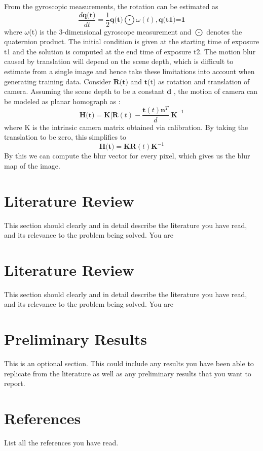 \documentclass[10pt,twocolumn,letterpaper]{article}
\begin{document}
From the gyroscopic measurements, the rotation can be estimated as
\begin{equation}
    \frac{d \textbf{q(t)}}{dt} = \frac{1}{2}\textbf{q(t)} \bigodot \omega(t), \textbf{q(t1)=1}
\end{equation}
where $\omega$(t) is the 3-dimensional gyroscope measurement and $\bigodot$ denotes the quaternion product. The initial condition is given at the starting time of exposure t1 and the solution is computed at the end time of exposure t2.
The motion blur caused by translation will depend on the scene depth, which is difficult to estimate from a single image and hence take these limitations into account when generating training data. Consider $\textbf{R(t)}$ and $\textbf{t}$(t) as rotation and translation of camera. Assuming the scene depth to be a constant $\textbf{d}$ , the motion of camera can be modeled as planar homograph as :
\begin{equation}
    \textbf{H(t)} = \textbf{K[R}(t) - \frac{\textbf{t}(t)\textbf{n}^{T}}{d}\textbf{]K}^{-1}
\end{equation}
where K is the intrinsic camera matrix obtained via calibration. By taking the translation to be zero, this simplifies to 
\begin{equation}
    \textbf{H(t)} = \textbf{KR}(t)\textbf{K}^{-1}
\end{equation}
By this we can compute the blur vector for every pixel, which gives us the blur map of the image.
\section{Literature Review}
\label{sec:literature}
This section should clearly and in detail describe the literature you have read, and its relevance to the problem being solved. You are 


\section{Literature Review}
\label{sec:literature}
This section should clearly and in detail describe the literature you have read, and its relevance to the problem being solved. You are 

\section{Preliminary Results}
\label{sec:prelim_results}
This is an optional section. This could include any results you have been able to replicate from the literature as well as any preliminary results that you want to report.

\section{References}
List all the references you have read.

{\small


}
\end{document}
